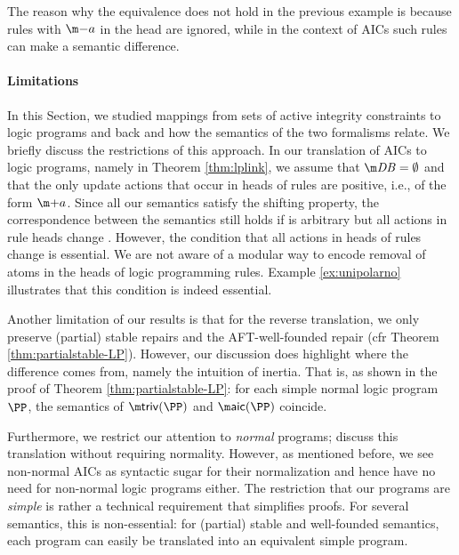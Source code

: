 The reason why the equivalence does not hold in the previous example is because rules with $\remove a$ in the head are ignored, while in the context of AICs such rules can make a semantic difference. 

\paragraph{Limitations}
In this Section, we studied mappings from sets of active integrity constraints to logic programs and back and how the semantics of the two formalisms relate. 
We briefly discuss the restrictions of this approach. 
In our translation of AICs to logic programs, namely in Theorem \ref{thm:lplink}, we assume that $\db=\emptyset$ and that the only update actions that occur in heads of rules are positive, i.e., of the form $\add a$. 
Since all our semantics satisfy the shifting property, the correspondence between the semantics still holds if \db is arbitrary but all actions in rule heads change \db. 
However, the condition that all actions in heads of rules change \db is essential. We are not aware of a modular way to encode removal of atoms in the heads of logic programming rules. 
Example \ref{ex:unipolarno} illustrates that this condition is indeed essential. 

Another limitation of our results is that for the reverse translation, we only preserve (partial) stable repairs and the AFT-well-founded repair (cfr Theorem \ref{thm:partialstable-LP}). 
However, our discussion does highlight where the difference comes from, namely the intuition of inertia. 
That is, as shown in the proof of Theorem \ref{thm:partialstable-LP}: for each simple normal logic program $\PP$, the semantics of $\triv(\PP)$ and $\aicop(\PP)$ coincide. 

Furthermore, we restrict our attention to \emph{normal} programs; \citet{tplp/CaropreseT11} discuss this translation without requiring normality. However, as mentioned before, we see non-normal AICs as syntactic sugar for their normalization and hence have no need for non-normal logic programs either. 
The restriction that our programs are \emph{simple} is rather a technical requirement that simplifies proofs. For several semantics, this is non-essential: for (partial) stable and well-founded semantics, each program can easily be translated into an equivalent simple program.  

